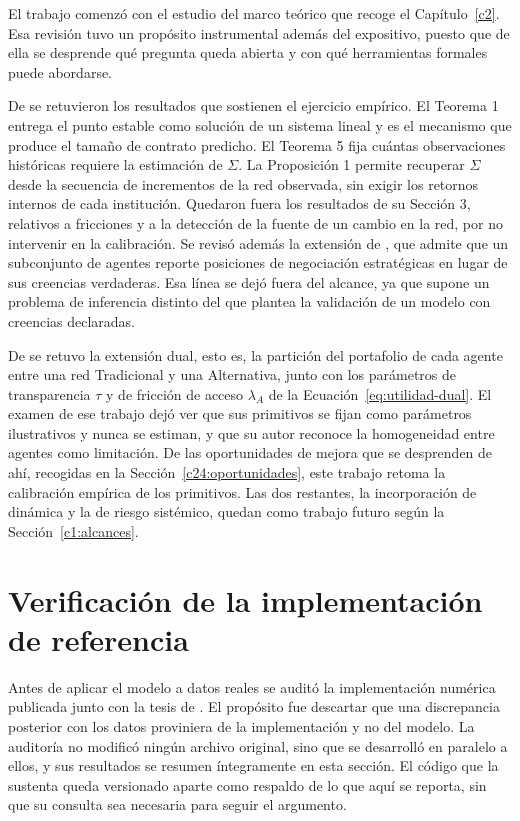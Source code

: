 El trabajo comenzó con el estudio del marco teórico que recoge el
Capítulo~\ref{c2}. Esa revisión tuvo un propósito instrumental además del
expositivo, puesto que de ella se desprende qué pregunta queda abierta y con qué
herramientas formales puede abordarse.

De  se retuvieron los resultados que sostienen
el ejercicio empírico. El Teorema 1 entrega el punto estable como solución de un
sistema lineal y es el mecanismo que produce el tamaño de contrato predicho. El
Teorema 5 fija cuántas observaciones históricas requiere la estimación de
$\Sigma$. La Proposición 1 permite recuperar $\Sigma$ desde la secuencia de
incrementos de la red observada, sin exigir los retornos internos de cada
institución. Quedaron fuera los resultados de su Sección 3, relativos a
fricciones y a la detección de la fuente de un cambio en la red, por no
intervenir en la calibración. Se revisó además la extensión de
, que admite que un subconjunto de agentes reporte
posiciones de negociación estratégicas en lugar de sus creencias verdaderas.
Esa línea se dejó fuera del alcance, ya que supone un problema de inferencia
distinto del que plantea la validación de un modelo con creencias declaradas.

De  se retuvo la extensión dual, esto es, la
partición del portafolio de cada agente entre una red Tradicional y una
Alternativa, junto con los parámetros de transparencia $\tau$ y de fricción de
acceso $\lambda_A$ de la Ecuación~\eqref{eq:utilidad-dual}. El examen de ese
trabajo dejó ver que sus primitivos se fijan como parámetros ilustrativos y
nunca se estiman, y que su autor reconoce la homogeneidad entre agentes como
limitación. De las oportunidades de mejora que se desprenden de ahí, recogidas
en la Sección~\ref{c24:oportunidades}, este trabajo retoma la calibración
empírica de los primitivos. Las dos restantes, la incorporación de dinámica y la
de riesgo sistémico, quedan como trabajo futuro según la
Sección~\ref{c1:alcances}.

\section{Verificación de la implementación de referencia}
\label{c3:auditoria}

Antes de aplicar el modelo a datos reales se auditó la implementación numérica
publicada junto con la tesis de . El
propósito fue descartar que una discrepancia posterior con los datos
proviniera de la implementación y no del modelo. La auditoría no modificó
ningún archivo original, sino que se desarrolló en paralelo a ellos, y sus
resultados se resumen íntegramente en esta sección. El código que la sustenta
queda versionado aparte como respaldo de lo que aquí se reporta, sin que su
consulta sea necesaria para seguir el argumento.

